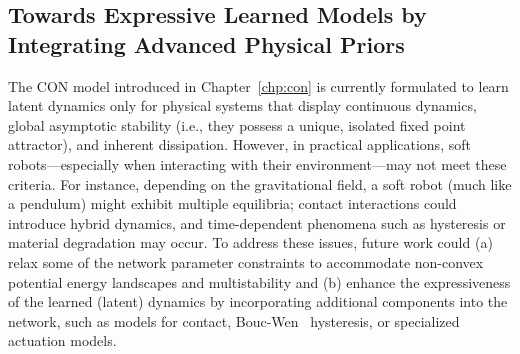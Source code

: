 \subsection{Towards Expressive Learned Models by Integrating Advanced Physical Priors}
The \gls{CON} model introduced in Chapter~\ref{chp:con} is currently formulated to learn latent dynamics only for physical systems that display continuous dynamics, global asymptotic stability (i.e., they possess a unique, isolated fixed point attractor), and inherent dissipation. However, in practical applications, soft robots—especially when interacting with their environment—may not meet these criteria. For instance, depending on the gravitational field, a soft robot (much like a pendulum) might exhibit multiple equilibria; contact interactions could introduce hybrid dynamics, and time-dependent phenomena such as hysteresis or material degradation may occur. To address these issues, future work could (a) relax some of the network parameter constraints to accommodate non-convex potential energy landscapes and multistability and (b) enhance the expressiveness of the learned (latent) dynamics by incorporating additional components into the network, such as models for contact, Bouc-Wen~\citep{bouc1967forced, wen1976method} hysteresis, or specialized actuation models.

